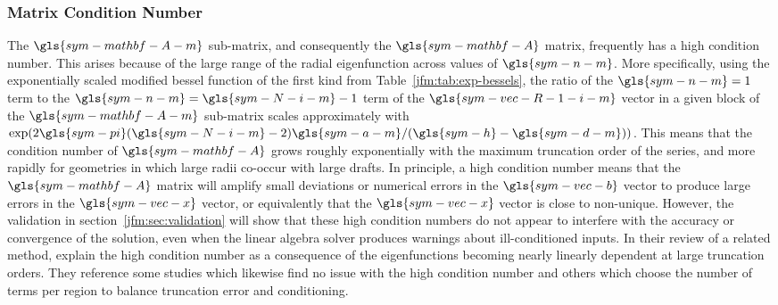\documentclass[lineno]{JFM-FLM_Au}
\begin{document}
\subsubsection{Matrix Condition Number}
The $\gls{sym-mathbf-A-m}$ sub-matrix, and consequently the $\gls{sym-mathbf-A}$ matrix, frequently has a high condition number. 
This arises because of the large range of the radial eigenfunction across values of $\gls{sym-n-m}$.
More specifically, using the exponentially scaled modified bessel function of the first kind from Table~\ref{jfm:tab:exp-bessels}, 
the ratio of the $\gls{sym-n-m}=1$ term to the $\gls{sym-n-m}=\gls{sym-N-i-m}-1$ term of the $\gls{sym-vec-R-1-i-m}$ vector in a given block of the $\gls{sym-mathbf-A-m}$ sub-matrix scales approximately with $\exp(2\gls{sym-pi} (\gls{sym-N-i-m}-2) \gls{sym-a-m}/(\gls{sym-h}-\gls{sym-d-m}))$.
This means that the condition number of $\gls{sym-mathbf-A}$ grows roughly exponentially with the maximum truncation order of the series, and more rapidly for geometries in which large radii co-occur with large drafts.
In principle, a high condition number means that the $\gls{sym-mathbf-A}$ matrix will amplify small deviations or numerical errors in the $\gls{sym-vec-b}$ vector to produce large errors in the $\gls{sym-vec-x}$ vector, or equivalently that the $\gls{sym-vec-x}$ vector is close to non-unique.
However, the validation in section~\ref{jfm:sec:validation} will show that these high condition numbers do not appear to interfere with the accuracy or convergence of the solution, even when the linear algebra solver produces warnings about ill-conditioned inputs.
In their review of a related method, \citet[Section 4.3]{hiptmair_survey_2016} explain the high condition number as a consequence of the eigenfunctions becoming nearly linearly dependent at large truncation orders.
They reference some studies which likewise find no issue with the high condition number and others which choose the number of terms per region to balance truncation error and conditioning.
\end{document}
